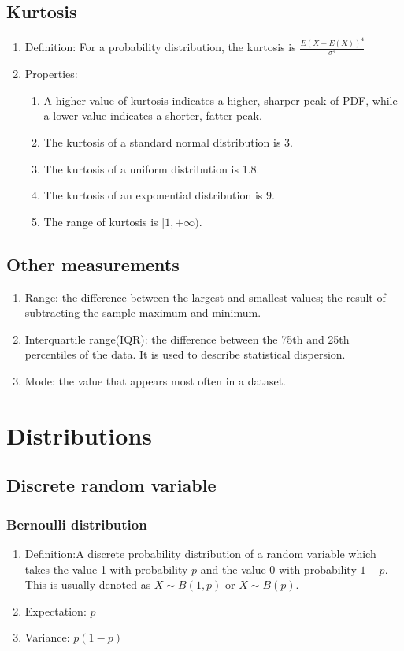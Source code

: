 \documentclass[a4paper]{article}
\begin{document}
\subsection{Kurtosis}
	\begin{enumerate}
	\item Definition: For a probability distribution, the kurtosis is $\frac{E(X-E(X))^4}{\sigma^4}$
	\item Properties:
		\begin{enumerate}
		\item A higher value of kurtosis indicates a higher, sharper peak of PDF, while a lower value indicates a shorter, fatter peak.
		\item The kurtosis of a standard normal distribution is 3.
		\item The kurtosis of a uniform distribution is 1.8.
		\item The kurtosis of an exponential distribution is 9.
		\item The range of kurtosis is $[1,+\infty)$.
		\end{enumerate}
	\end{enumerate}

\subsection{Other measurements}
	\begin{enumerate}
	\item Range: the difference between the largest and smallest values; the result of subtracting the sample maximum and minimum.
	\item Interquartile range(IQR): the difference between the 75th and 25th percentiles of the data. It is used to describe statistical dispersion.
	\item Mode: the value that appears most often in a dataset.
	\end{enumerate}


\section{Distributions}
\subsection{Discrete random variable}
	\subsubsection{Bernoulli distribution}
		\begin{enumerate}
		\item Definition:A discrete probability distribution of a random variable which takes the value 1 with probability $p$ and the value 0 with probability $1-p$. This is usually denoted as $X\sim B(1,p)$ or $X\sim B(p)$.
		\item Expectation: $p$
		\item Variance: $p(1-p)$
		\end{enumerate}
\end{document}
